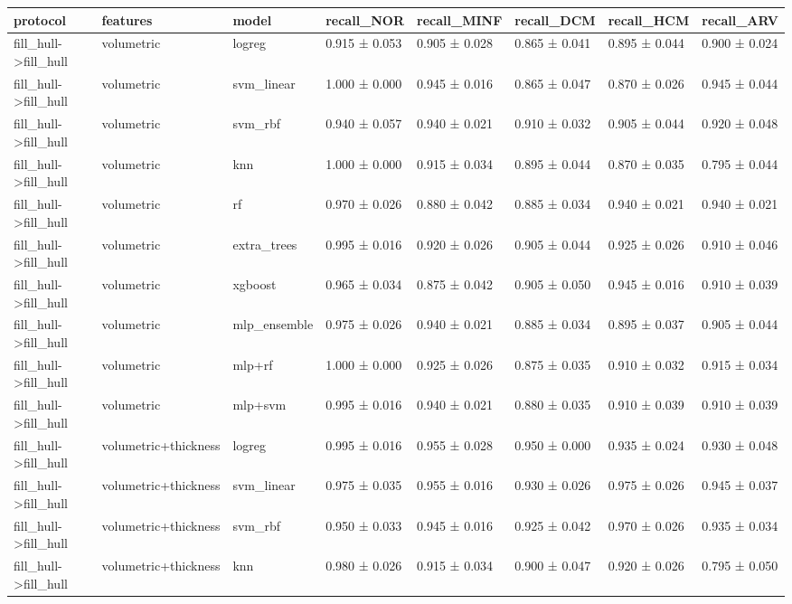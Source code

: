 \begin{tabular}{llllllll}
\toprule
protocol & features & model & recall\_NOR & recall\_MINF & recall\_DCM & recall\_HCM & recall\_ARV \\
\midrule
fill\_hull->fill\_hull & volumetric & logreg & 0.915 ± 0.053 & 0.905 ± 0.028 & 0.865 ± 0.041 & 0.895 ± 0.044 & 0.900 ± 0.024 \\
fill\_hull->fill\_hull & volumetric & svm\_linear & 1.000 ± 0.000 & 0.945 ± 0.016 & 0.865 ± 0.047 & 0.870 ± 0.026 & 0.945 ± 0.044 \\
fill\_hull->fill\_hull & volumetric & svm\_rbf & 0.940 ± 0.057 & 0.940 ± 0.021 & 0.910 ± 0.032 & 0.905 ± 0.044 & 0.920 ± 0.048 \\
fill\_hull->fill\_hull & volumetric & knn & 1.000 ± 0.000 & 0.915 ± 0.034 & 0.895 ± 0.044 & 0.870 ± 0.035 & 0.795 ± 0.044 \\
fill\_hull->fill\_hull & volumetric & rf & 0.970 ± 0.026 & 0.880 ± 0.042 & 0.885 ± 0.034 & 0.940 ± 0.021 & 0.940 ± 0.021 \\
fill\_hull->fill\_hull & volumetric & extra\_trees & 0.995 ± 0.016 & 0.920 ± 0.026 & 0.905 ± 0.044 & 0.925 ± 0.026 & 0.910 ± 0.046 \\
fill\_hull->fill\_hull & volumetric & xgboost & 0.965 ± 0.034 & 0.875 ± 0.042 & 0.905 ± 0.050 & 0.945 ± 0.016 & 0.910 ± 0.039 \\
fill\_hull->fill\_hull & volumetric & mlp\_ensemble & 0.975 ± 0.026 & 0.940 ± 0.021 & 0.885 ± 0.034 & 0.895 ± 0.037 & 0.905 ± 0.044 \\
fill\_hull->fill\_hull & volumetric & mlp+rf & 1.000 ± 0.000 & 0.925 ± 0.026 & 0.875 ± 0.035 & 0.910 ± 0.032 & 0.915 ± 0.034 \\
fill\_hull->fill\_hull & volumetric & mlp+svm & 0.995 ± 0.016 & 0.940 ± 0.021 & 0.880 ± 0.035 & 0.910 ± 0.039 & 0.910 ± 0.039 \\
fill\_hull->fill\_hull & volumetric+thickness & logreg & 0.995 ± 0.016 & 0.955 ± 0.028 & 0.950 ± 0.000 & 0.935 ± 0.024 & 0.930 ± 0.048 \\
fill\_hull->fill\_hull & volumetric+thickness & svm\_linear & 0.975 ± 0.035 & 0.955 ± 0.016 & 0.930 ± 0.026 & 0.975 ± 0.026 & 0.945 ± 0.037 \\
fill\_hull->fill\_hull & volumetric+thickness & svm\_rbf & 0.950 ± 0.033 & 0.945 ± 0.016 & 0.925 ± 0.042 & 0.970 ± 0.026 & 0.935 ± 0.034 \\
fill\_hull->fill\_hull & volumetric+thickness & knn & 0.980 ± 0.026 & 0.915 ± 0.034 & 0.900 ± 0.047 & 0.920 ± 0.026 & 0.795 ± 0.050 \\

\end{tabular}
